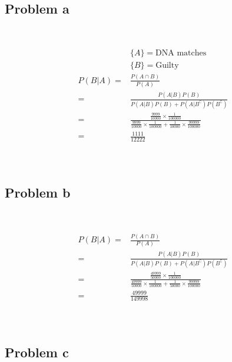 \documentclass{article}
\begin{document}
~

\subsection*{Problem a}

~

\begin{equation*}
    \begin{split}
        &\{A\}=\text{DNA matches}\\
        &\{B\}=\text{Guilty}\\
        P(B|A)=&\frac{P(A\cap B)}{P(A)}\\
        =&\frac{P(A|B)P(B)}{P(A|B)P(B)+P(A|B^\complement)P(B^\complement)}\\
        =&\frac{\frac{9999}{10000}\times\frac{1}{100000}}{\frac{9999}{10000}\times\frac{1}{100000}+\frac{1}{10000}\times\frac{99999}{100000}}\\
        =&\frac{1111}{12222}\\
    \end{split}
\end{equation*}

~

\subsection*{Problem b}

~

\begin{equation*}
    \begin{split}
        P(B|A)=&\frac{P(A\cap B)}{P(A)}\\
        =&\frac{P(A|B)P(B)}{P(A|B)P(B)+P(A|B^\complement)P(B^\complement)}\\
        =&\frac{\frac{49999}{50000}\times\frac{1}{100000}}{\frac{49999}{50000}\times\frac{1}{100000}+\frac{1}{50000}\times\frac{99999}{100000}}\\
        =&\frac{49999}{149998}\\
    \end{split}
\end{equation*}

~

\subsection*{Problem c}

~
\end{document}
